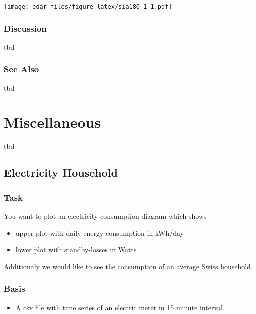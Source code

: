 \documentclass[
]{book}
\providecommand{\tightlist}{%
  \setlength{\itemsep}{0pt}\setlength{\parskip}{0pt}}
\begin{document}
\texttt{[image: edar\_files/figure-latex/sia180\_1-1.pdf]}

\hypertarget{discussion-7}{%
\subsection{Discussion}\label{discussion-7}}

tbd

\hypertarget{see-also-2}{%
\subsection{See Also}\label{see-also-2}}

tbd

\hypertarget{miscellaneous}{%
\chapter{Miscellaneous}\label{miscellaneous}}

tbd

\hypertarget{electricity-household}{%
\section{Electricity Household}\label{electricity-household}}

\hypertarget{task-3}{%
\subsection{Task}\label{task-3}}

You want to plot an electricity consumption diagram which shows

\begin{itemize}
\tightlist
\item
  upper plot with daily energy consumption in kWh/day
\item
  lower plot with standby-losses in Watts
\end{itemize}

Additionaly we would like to see the consumption of an average Swiss household.

\hypertarget{basis-4}{%
\subsection{Basis}\label{basis-4}}

\begin{itemize}
\tightlist
\item
  A csv file with time series of an electric meter in 15 minute interval.
\end{itemize}
\end{document}
